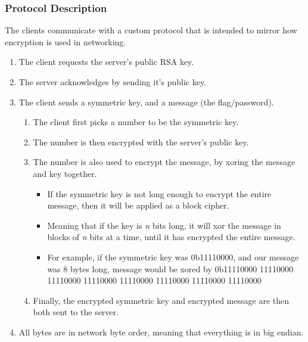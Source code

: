 {                \subsubsection*{Protocol Description}
                    The clients communicate with a custom protocol that is intended to mirror how encryption is used in networking. 
                    \begin{enumerate}
                        \item The client requests the server's public RSA key.
                        \item The server acknowledges by sending it's public key.
                        \item The client sends a symmetric key, and a message (the flag/password).
                        \begin{enumerate}[1.]
                            \item The client first picks a number to be the symmetric key.
                            \item The number is then encrypted with the server's public key.
                            \item The number is also used to encrypt the message, by xoring the message and key together.
                            \begin{itemize}
                                \item If the symmetric key is not long enough to encrypt the entire message, then it will be applied as a block cipher.
                                \item Meaning that if the key is \textit{n} bits long, it will xor the message in blocks of \textit{n} bits at a time, until it has encrypted the entire message.
                                \item For example, if the symmetric key was 0b11110000, and our message was 8 bytes long, message would be xored by 0b11110000 11110000 11110000 11110000 11110000 11110000 11110000 11110000
                            \end{itemize}
                            \item Finally, the encrypted symmetric key and encrypted message are then both sent to the server.
                        \end{enumerate}
                        \item All bytes are in network byte order, meaning that everything is in big endian.
                    \end{enumerate}

}
